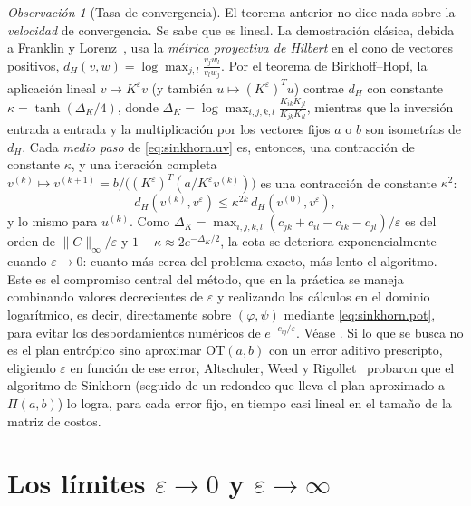 \documentclass[12pt, a4paper]{amsbook}
\theoremstyle{remark}
\newtheorem{obs}[teo]{Observación}
\theoremstyle{definition}
\numberwithin{section}{chapter}
\numberwithin{subsection}{section}
\numberwithin{equation}{section}
\numberwithin{figure}{chapter}
\begin{document}
\begin{obs}[Tasa de convergencia]\label{obs.sinkhorn.tasa}
El teorema anterior no dice nada sobre la \emph{velocidad} de convergencia.
Se sabe que es lineal. La demostración clásica, debida a Franklin y
Lorenz~\cite{FranklinLorenz1989}, usa la \emph{métrica proyectiva de
Hilbert} en el cono de vectores positivos,
$d_H(v,w)=\log\max_{j,l}\frac{v_jw_l}{v_lw_j}$. Por el teorema de
Birkhoff--Hopf, la aplicación lineal $v\mapsto K^\varepsilon v$ (y también
$u\mapsto(K^\varepsilon)^Tu$) contrae $d_H$ con constante
$\kappa=\tanh(\Delta_K/4)$, donde
$\Delta_K=\log\max_{i,j,k,l}\frac{K_{ik}K_{jl}}{K_{jk}K_{il}}$, mientras que
la inversión entrada a entrada y la multiplicación por los vectores fijos
$a$ o $b$ son isometrías de $d_H$. Cada \emph{medio paso} de
\eqref{eq:sinkhorn.uv} es, entonces, una contracción de constante $\kappa$,
y una iteración completa $v^{(k)}\mapsto v^{(k+1)}=b/\bigl((K^\varepsilon)^T(a/K^\varepsilon v^{(k)})\bigr)$
es una contracción de constante $\kappa^2$:
\[
d_H(v^{(k)},v^\varepsilon)\le\kappa^{2k}\,d_H(v^{(0)},v^\varepsilon),
\]
y lo mismo para $u^{(k)}$. Como
$\Delta_K=\max_{i,j,k,l}(c_{jk}+c_{il}-c_{ik}-c_{jl})/\varepsilon$ es del
orden de $\|C\|_\infty/\varepsilon$ y $1-\kappa\approx2e^{-\Delta_K/2}$, la
cota se deteriora exponencialmente cuando $\varepsilon\to0$: cuanto más
cerca del problema exacto, más lento el algoritmo. Este es el compromiso central del método,
que en la práctica se maneja combinando valores decrecientes de
$\varepsilon$ y realizando los cálculos en el dominio logarítmico, es decir,
directamente sobre $(\varphi,\psi)$ mediante \eqref{eq:sinkhorn.pot}, para
evitar los desbordamientos numéricos de $e^{-c_{ij}/\varepsilon}$. Véase
\cite[Chapter~4]{PeyreCuturi2019}. Si lo que se busca no es el plan
entrópico sino aproximar $\mathrm{OT}(a,b)$ con un error aditivo prescripto,
eligiendo $\varepsilon$ en función de ese error, Altschuler, Weed y
Rigollet~\cite{AltschulerWeedRigollet2017} probaron que el algoritmo de
Sinkhorn (seguido de un redondeo que lleva el plan aproximado a
$\Pi(a,b)$) lo logra, para cada error fijo, en tiempo casi lineal en el
tamaño de la matriz de costos.
\end{obs}

\section{Los límites $\varepsilon\to0$ y $\varepsilon\to\infty$}\label{sec.eps.limites}
\end{document}
